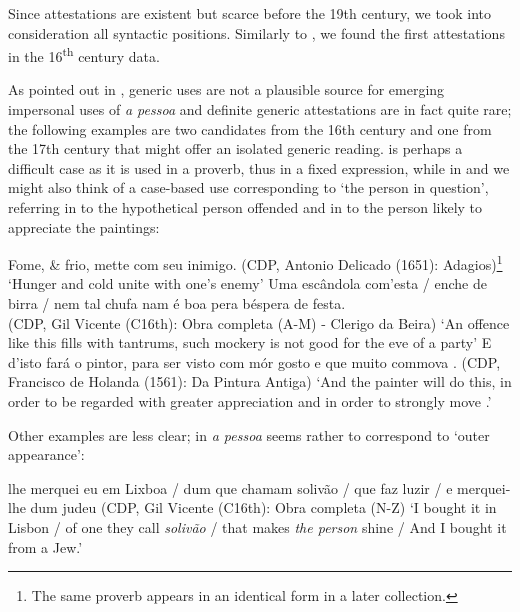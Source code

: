 \documentclass[output=paper]{langscibook}
\begin{document}
{Since attestations are existent but scarce before the 19th century, we took into consideration all syntactic positions. Similarly to \citet{Martins2022}, we found the first attestations in the 16}{\textsuperscript{th}} {century data.}



{As pointed out in , generic uses are not a plausible source for emerging impersonal uses of} {\textit{a pessoa} }{and definite generic attestations are in fact quite rare; the following examples are two candidates from the 16th century and one from the 17th century that might offer an isolated generic reading.  is perhaps a difficult case as it is used in a proverb, thus in a fixed expression, while in  and  we might also think of a case-based use corresponding to ‘the person in question’, referring in  to the hypothetical person offended and in  to the person likely to appreciate the paintings:}



\eanoraggedright\label{ex:amaral:18}
Fome, \& frio, mette  com seu inimigo. {(CDP, Antonio Delicado (1651): Adagios)}\footnote{The same proverb appears in an identical form in a later collection.}
\glt ‘Hunger and cold unite  with one’s enemy’
\ex\label{ex:amaral:19}
Uma escândola com’esta / enche de birra  / nem tal chufa nam é boa pera béspera de festa.\\
{(CDP, Gil Vicente (C16th): Obra completa (A-M) - Clerigo da Beira})
\glt ‘An offence like this fills  with tantrums, such mockery is not good for the eve of a party’
\ex\label{ex:amaral:20}
E d’isto fará o pintor, para ser visto com mór gosto e que muito commova . {(CDP, Francisco de Holanda (1561): Da Pintura Antiga)}
\glt ‘And the painter will do this, in order to be regarded with greater appreciation and in order to strongly move .’
\z 


Other examples are less clear; in  \textit{a pessoa} seems rather to correspond to ‘outer appearance’:


\eanoraggedright\label{ex:amaral:21}
lhe merquei eu em Lixboa / dum que chamam solivão / que faz luzir  / e merquei-lhe dum judeu {(CDP, Gil Vicente (C16th): Obra completa (N-Z)}
\glt ‘I bought it in Lisbon / of one they call \textit{solivão} / that makes \textit{the person} shine / And I bought it from a Jew.’
\z 
\end{document}
